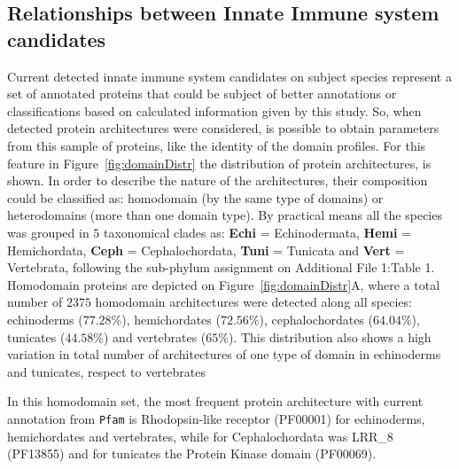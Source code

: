 \documentclass[11pt]{article}
\begin{document}
\subsection*{Relationships between Innate Immune system candidates}\label{Orthology}

Current detected innate immune system candidates on subject species represent
a set of annotated proteins that could be subject of better annotations or
classifications based on calculated information given by this study. So, 
when detected protein architectures were considered, is possible to obtain 
parameters from this sample of proteins, like the identity of the domain profiles. 
For this feature in Figure~\ref{fig:domainDistr} the distribution of protein architectures, 
is shown. In order to describe the nature of the architectures, their composition could be
classified as: homodomain (by the same type of domains) or  heterodomains (more than one 
domain type). By practical means all the species was grouped in $5$ taxonomical clades as:
\textbf{Echi} = Echinodermata, \textbf{Hemi} = Hemichordata, \textbf{Ceph} = Cephalochordata, 
\textbf{Tuni} = Tunicata and \textbf{Vert} = Vertebrata, following the sub-phylum 
assignment on Additional File 1:Table 1. Homodomain proteins are depicted on 
Figure~\ref{fig:domainDistr}A, where a total number of $2375$ homodomain architectures 
were detected along all species: echinoderms ($77.28$\%), hemichordates ($72.56$\%), 
cephalochordates ($64.04$\%), tunicates ($44.58$\%) and vertebrates ($65$\%). 
This distribution also shows a high variation in total number of architectures of 
one type of domain in echinoderms and tunicates, respect to vertebrates 

In this homodomain set, the most frequent protein architecture with 
current annotation from \texttt{Pfam} is Rhodopsin-like receptor 
(PF00001) for echinoderms, hemichordates and vertebrates, while for 
Cephalochordata was LRR\_8 (PF13855) and for tunicates the Protein 
Kinase domain (PF00069). 

 

\end{document}
